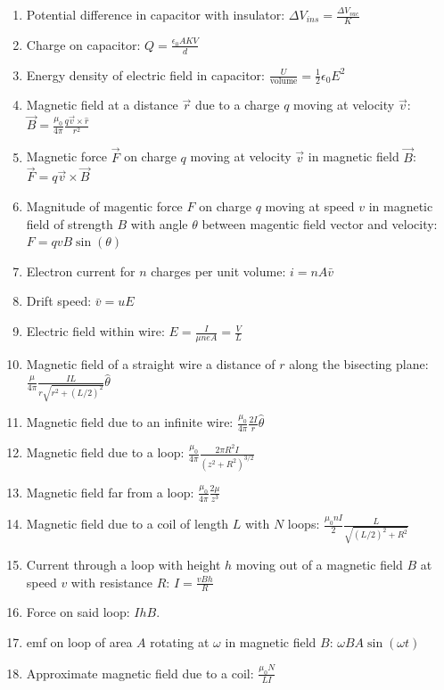 \documentclass[nobib]{tufte-handout}
\begin{document}
\begin{enumerate}
    \item Potential difference in capacitor with insulator: $\Delta V_{ins} = \frac{\Delta V_{vac}}{K}$
    \item Charge on capacitor: $Q=\frac{\epsilon_0 AKV}{d}$
    \item Energy density of electric field in capacitor: $\frac{U}{\text{volume}} = \frac{1}{2} \epsilon_0 E^2$
    \item Magnetic field at a distance $\vec{r}$ due to a charge $q$ moving at velocity $\vec{v}$: $\vec{B} = \frac{\mu_0}{4 \pi}\frac{q\vec{v}\times \hat{r}}{r^2}$
    \item Magnetic force $\vec{F}$ on charge $q$ moving at velocity $\vec{v}$ in magnetic field $\vec{B}$: 
    $\vec{F} = q\vec{v} \times \vec{B}$
    \item Magnitude of magentic force $F$ on charge $q$ moving at speed $v$ in magnetic field of strength $B$
    with angle $\theta$ between magentic field vector and velocity: $F = qvB\sin(\theta)$
    \item Electron current for $n$ charges per unit volume: $i = nA\bar{v}$
    \item Drift speed: $\bar{v} = uE$
    \item Electric field within wire: $E = \frac{I}{\mu n e A} = \frac{V}{L}$
    \item Magnetic field of a straight wire a distance of $r$ along the bisecting plane: 
    $\frac{\mu}{4 \pi} \frac{IL}{r\sqrt{r^2+(L/2)^2}}\hat{\theta}$
    \item Magnetic field due to an infinite wire: $\frac{\mu_0}{4 \pi} \frac{2I}{r}\hat{\theta}$
    \item Magnetic field due to a loop: $\frac{\mu_0}{4 \pi} \frac{2 \pi R^2 I}{(z^2+R^2)^{3/2}}$
    \item Magnetic field far from a loop: $\frac{\mu_0}{4 \pi}\frac{2 \mu}{z^3}$
    \item Magnetic field due to a coil of length $L$ with $N$ loops: $\frac{\mu_0 nI}{2} \frac{L}{\sqrt{(L/2)^2 + R^2}}$
    \item Current through a loop with height $h$ moving out of a magnetic field $B$ at speed $v$ with resistance $R$: $I = \frac{vBh}{R}$
    \item Force on said loop: $IhB$. 
    \item emf on loop of area $A$ rotating at $\omega$ in magnetic field $B$: $\omega B A \sin(\omega t)$
    \item Approximate magnetic field due to a coil: $\frac{\mu_0 N}{LI}$

\end{enumerate}
\end{document}
